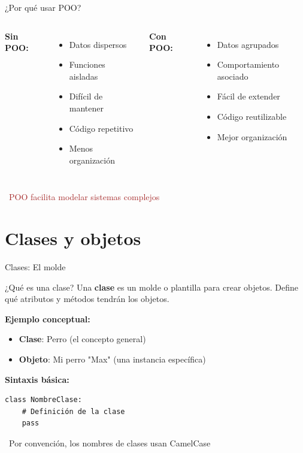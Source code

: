 \documentclass{beamer}
\begin{document}
\begin{frame}{¿Por qué usar POO? \faQuestion}
\begin{columns}[T]
\textbf{Sin POO:} \faTimesCircle
\small
\begin{itemize}
    \item Datos dispersos
    \item Funciones aisladas
    \item Difícil de mantener
    \item Código repetitivo
    \item Menos organización
\end{itemize}

\textbf{Con POO:} \faCheckCircle
\small
\begin{itemize}
    \item Datos agrupados
    \item Comportamiento asociado
    \item Fácil de extender
    \item Código reutilizable
    \item Mejor organización
\end{itemize}
\end{columns}

\vspace{0.3cm}
\begin{center}
\textcolor{brown}{\faInfoCircle\ POO facilita modelar sistemas complejos}
\end{center}
\end{frame}

\section{Clases y objetos}

\begin{frame}[fragile]{Clases: El molde \faDrawPolygon}
\begin{conceptbox}{¿Qué es una clase?}
Una \textbf{clase} es un molde o plantilla para crear objetos. Define qué atributos y métodos tendrán los objetos.
\end{conceptbox}

\textbf{Ejemplo conceptual:}
\small
\begin{itemize}
    \item[\faDrawPolygon] \textbf{Clase}: Perro (el concepto general)
    \item[\faDog] \textbf{Objeto}: Mi perro "Max" (una instancia específica)
\end{itemize}

\vspace{0.2cm}
\textbf{Sintaxis básica:}
\begin{lstlisting}
class NombreClase:
    # Definición de la clase
    pass
\end{lstlisting}

\vspace{-0.1cm}
\begin{notebox}
\small\faInfoCircle\ Por convención, los nombres de clases usan CamelCase
\end{notebox}
\end{frame}
\end{document}

